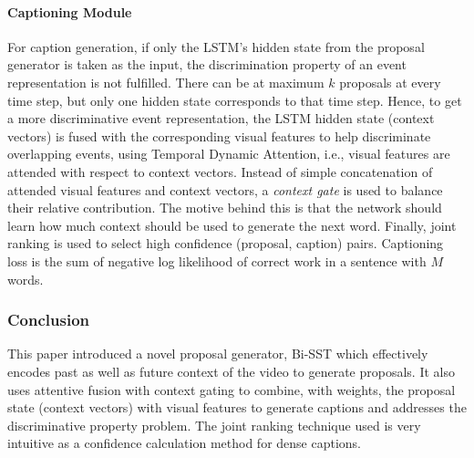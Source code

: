 \paragraph{Captioning Module}
For caption generation, if only the LSTM's hidden state from the proposal generator is taken 
as the input, the discrimination property of an event representation is not fulfilled. There 
can be at maximum $k$ proposals at every time step, but only one hidden state corresponds to 
that time step. Hence, to get a more discriminative event representation, the LSTM hidden 
state (context vectors) is fused with the corresponding visual features to help discriminate 
overlapping events, using Temporal Dynamic Attention, i.e., visual features are attended with 
respect to context vectors. Instead of simple concatenation of attended visual features and 
context vectors, a \textit{context gate} is used to balance their relative contribution. The 
motive behind this is that the network should learn how much context should be used to 
generate the next word. Finally, joint ranking is used to select high confidence (proposal, 
caption) pairs. Captioning loss is the sum of negative log likelihood of correct work in a 
sentence with $M$ words.



\subsubsection{Conclusion}
\par This paper introduced a novel proposal generator, Bi-SST which effectively encodes past 
as well as future context of the video to generate proposals. It also uses attentive fusion  
with context gating to combine, with weights, the proposal state  (context vectors) with 
visual features to generate captions and addresses the discriminative property problem. The 
joint ranking technique used is very intuitive as a confidence calculation method for dense 
captions.
